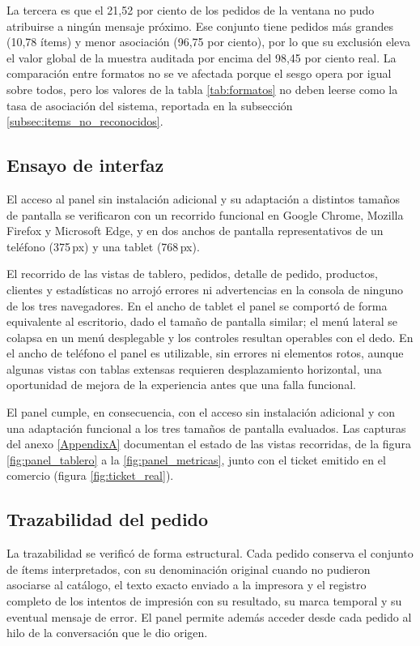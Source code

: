 La tercera es que el 21,52 por ciento de los pedidos de la ventana no pudo atribuirse a ningún mensaje próximo. Ese conjunto tiene pedidos más grandes (10,78 ítems) y menor asociación (96,75 por ciento), por lo que su exclusión eleva el valor global de la muestra auditada por encima del 98,45 por ciento real. La comparación entre formatos no se ve afectada porque el sesgo opera por igual sobre todos, pero los valores de la tabla \ref{tab:formatos} no deben leerse como la tasa de asociación del sistema, reportada en la subsección \ref{subsec:items_no_reconocidos}.

\subsection{Ensayo de interfaz}
\label{subsec:ensayo_interfaz}

El acceso al panel sin instalación adicional y su adaptación a distintos tamaños de pantalla se verificaron con un recorrido funcional en Google Chrome, Mozilla Firefox y Microsoft Edge, y en dos anchos de pantalla representativos de un teléfono (375\,px) y una tablet (768\,px).

El recorrido de las vistas de tablero, pedidos, detalle de pedido, productos, clientes y estadísticas no arrojó errores ni advertencias en la consola de ninguno de los tres navegadores. En el ancho de tablet el panel se comportó de forma equivalente al escritorio, dado el tamaño de pantalla similar; el menú lateral se colapsa en un menú desplegable y los controles resultan operables con el dedo. En el ancho de teléfono el panel es utilizable, sin errores ni elementos rotos, aunque algunas vistas con tablas extensas requieren desplazamiento horizontal, una oportunidad de mejora de la experiencia antes que una falla funcional.

El panel cumple, en consecuencia, con el acceso sin instalación adicional y con una adaptación funcional a los tres tamaños de pantalla evaluados. Las capturas del anexo \ref{AppendixA} documentan el estado de las vistas recorridas, de la figura \ref{fig:panel_tablero} a la \ref{fig:panel_metricas}, junto con el ticket emitido en el comercio (figura \ref{fig:ticket_real}).

\subsection{Trazabilidad del pedido}
\label{subsec:trazabilidad}

La trazabilidad se verificó de forma estructural. Cada pedido conserva el conjunto de ítems interpretados, con su denominación original cuando no pudieron asociarse al catálogo, el texto exacto enviado a la impresora y el registro completo de los intentos de impresión con su resultado, su marca temporal y su eventual mensaje de error. El panel permite además acceder desde cada pedido al hilo de la conversación que le dio origen.

